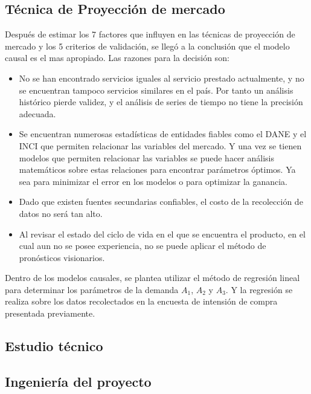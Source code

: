 \documentclass[a4paper, 12pt, oneside]{article}
\begin{document}
	\subsection{Técnica de Proyección de mercado}
	Después de estimar los 7 factores que influyen en las técnicas de proyección de mercado y los 5 criterios de validación, se llegó a la conclusión que el modelo causal es el mas apropiado. Las razones para la decisión son:
	\begin{itemize}
		\item No se han encontrado servicios iguales al servicio prestado actualmente, y no se encuentran tampoco servicios similares en el país. Por tanto un análisis histórico pierde validez, y el análisis de series de tiempo no tiene la precisión adecuada.
		\item Se encuentran numerosas estadísticas de entidades fiables como el DANE y el INCI que permiten relacionar las variables del mercado. Y una vez se tienen modelos que permiten relacionar las variables se puede hacer análisis matemáticos sobre estas relaciones para encontrar parámetros óptimos. Ya sea para minimizar el error en los modelos o para optimizar la ganancia.
		\item Dado que existen fuentes secundarias confiables, el costo de la recolección de datos no será tan alto.
		\item Al revisar el estado del ciclo de vida en el que se encuentra el producto, en el cual aun no se posee experiencia, no se puede aplicar el método de pronósticos visionarios.
	\end{itemize}
	Dentro de los modelos causales, se plantea utilizar el método de regresión lineal para determinar los parámetros de la demanda $A_1$, $A_2$ y $A_3$. Y la regresión se realiza sobre los datos recolectados en la encuesta de intensión de compra presentada previamente.
	
	\clearpage
	
	\begin{center}
	\section{Estudio técnico}
	\end{center}
	
	\subsection{Ingeniería del proyecto}
	
\end{document}
